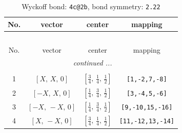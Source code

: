 \documentclass[fleqn,8pt]{jsarticle}
\begin{document}
\renewcommand{\arraystretch}{1.2}
\begin{longtable}{cccc}
\caption{Wyckoff bond: {\tt 4c@2b}, bond symmetry: {\tt 2.22}}
 \\
 \hline \hline
No. & vector & center & mapping \\ \hline \endfirsthead

\multicolumn{3}{l}{\tablename\ \thetable{}} \\
 \hline \hline
No. & vector & center & mapping \\ \hline \endhead

 \hline \hline
\multicolumn{3}{r}{\footnotesize\it continued ...} \\ \endfoot

 \hline \hline
\multicolumn{3}{r}{} \\ \endlastfoot

1 & $\left[ X,\, X,\, 0 \right]$ & $\left[ \frac{3}{4},\, \frac{1}{4},\, \frac{1}{2} \right]$ & {\tt [1,-2,7,-8]} \\ \hline
2 & $\left[ - X,\, X,\, 0 \right]$ & $\left[ \frac{1}{4},\, \frac{3}{4},\, \frac{1}{2} \right]$ & {\tt [3,-4,5,-6]} \\ \hline
3 & $\left[ - X,\, - X,\, 0 \right]$ & $\left[ \frac{1}{4},\, \frac{3}{4},\, \frac{1}{2} \right]$ & {\tt [9,-10,15,-16]} \\ \hline
4 & $\left[ X,\, - X,\, 0 \right]$ & $\left[ \frac{3}{4},\, \frac{1}{4},\, \frac{1}{2} \right]$ & {\tt [11,-12,13,-14]} \\
\end{longtable}
\renewcommand{\arraystretch}{1.2}
\end{document}
